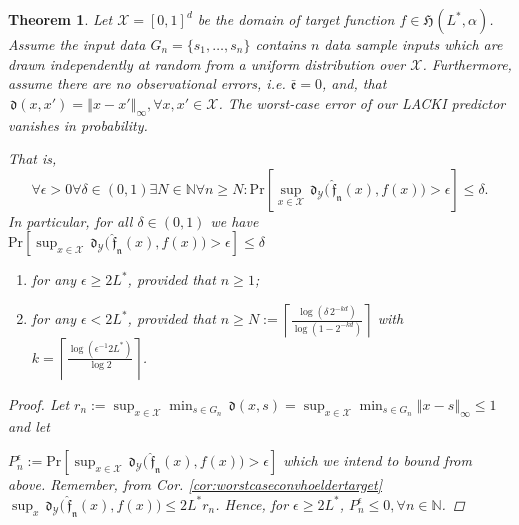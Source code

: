 \documentclass{article} %
\newtheorem{thm}{Theorem}[section]
\theoremstyle{definition}
\theoremstyle{remark}
\newcommand{\norm}[1]{\left\Vert#1\right\Vert}
\newcommand{\nat}{\mathbb N}
\newcommand{\ceil}[1]{ \left\lceil #1 \right\rceil }
\newcommand{\inspace}{\ensuremath{ \mathcal X}}
\newcommand{\outspace}{\ensuremath{ \mathcal Y}}
\newcommand{\grid}{\ensuremath{  G}}
\newcommand{\metric}{\, \mathfrak{d}} %
\newcommand{\Metrico}[2]{\metric_\outspace\bigl(#1,#2\bigr) }
\newcommand{\predfn}{\, \mathfrak{  \hat f_n}} %
\newcommand{\hexp}{{ \alpha }}%
\newcommand{\hoelset}[3]{\mathfrak{H}_{#2}(#1,#3)}
\newcommand{\obserrbnd}{\bar{\mathfrak e}}
\renewcommand{\Pr}{\mathrm{Pr}}
\begin{document}
\begin{thm} Let $\inspace = [0,1]^d $ be the domain of target function $f \in \hoelset {L^*} { } \hexp $. Assume the input data $\grid_n = \{s_1,\dots,s_n\}$ contains $n$ data sample inputs which are drawn independently at random from a uniform distribution over $\inspace$. Furthermore, assume there are no observational errors, i.e. $\obserrbnd =0$, and, that $\metric(x,x') = \norm{x-x'}_\infty, \forall x,x' \in \inspace$. The worst-case error of our LACKI predictor vanishes in probability. 

That is, 
$$\forall \epsilon >0 \forall \delta \in (0,1) \exists N \in \nat \forall n \geq N : \Pr[ \sup_{x \in \inspace} \Metrico{\predfn(x)}{f(x)} >\epsilon] \leq \delta.$$
In particular, for all $\delta \in (0,1)$ we have 
$\Pr[ \sup_{x \in \inspace} \Metrico{\predfn(x)}{f(x)} >\epsilon] \leq \delta$
\begin{enumerate}
\item  for any $\epsilon \geq 2 L^*$, provided that $n \geq 1$;
\item for any $\epsilon < 2 L^*$, provided that $n \geq N := \ceil{\frac{ \log(\delta \, 2^{-kd}  )}{\log(1- 2^{-kd})} }$ with $k= \ceil{\frac{\log(\epsilon^{-1}2 L^*)}{\log 2}}$.
\end{enumerate}
\begin{proof}
Let $r_n := \sup_{x \in \inspace} \min_{s \in \grid_n} \metric(x,s) = \sup_{x \in \inspace} \min_{s \in \grid_n} \norm{x-s}_\infty \leq 1$ and let 

$P_n^\epsilon := \Pr[ \sup_{x \in \inspace} \Metrico{\predfn(x)}{f(x)} >\epsilon]$ which we intend to bound from above.
Remember, from Cor. \ref{cor:worstcaseconvhoeldertarget} $\sup_x \Metrico{\predfn(x)}{f(x)} \leq 2 L^*  r_n $. Hence, for $\epsilon \geq 2 L^*$, $P_n^\epsilon \leq 0, \forall n \in \nat$.


\end{proof}
\end{thm}
\end{document}
